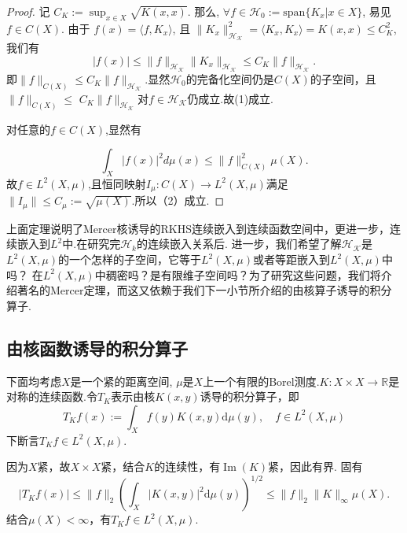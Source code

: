 \documentclass[../master.tex]{subfiles}
\begin{document}
\begin{proof}
    记 $C_K := \sup_{x \in X} \sqrt{K(x, x)}$. 那么, $\forall f \in \mathcal{H}_0 := \text{span}\{K_x | x \in X\}$, 易见 $f \in C(X)$. 由于 $f(x) = \langle f, K_x  \rangle$, 且 $\|K_x\|_{\mathcal{H_K}}^2 = \langle K_x, K_x \rangle = K(x, x) \leq C_K^2$, 我们有
$$|f(x)| \leq \|f\|_{\mathcal{H_K}} \|K_x\|_{\mathcal{H_K}} \leq C_K \|f\|_{\mathcal{H_K}}.$$
即$\|f\|_{C(X)}\leq C_K\|f\|_{\mathcal{H_K}}$.显然$\mathcal{H}_0$的完备化空间仍是$C(X)$的子空间，且$\|f\|_{C(X)}\leq$
$C_{K}\|f\|_{\mathcal{H_K}}$对$f\in\mathcal{H_K}$仍成立.故(1)成立.

对任意的$f\in C(X)$,显然有

$$\int_X|f(x)|^2d\mu(x)\leq\|f\|_{C(X)}^2\mu(X).$$
故$f\in L^2(X,\mu)$,且恒同映射$I_\mu:C(X)\to L^2(X,\mu)$满足$\|I_\mu\|\leq C_\mu:=\sqrt{\mu(X)}$.所以（2）成立.
\end{proof}

上面定理说明了Mercer核诱导的RKHS连续嵌入到连续函数空间中，更进一步，连续嵌入到$L^2$中.在研究完$\mathcal{H}_k$的连续嵌入关系后. 进一步，我们希望了解$\mathcal{H_K}$是$L^2(X,\mu)$的一个怎样的子空间，它等于$L^2(X,\mu)$或者等距嵌入到$L^2(X,\mu)$中吗？ 在$L^2(X,\mu)$中稠密吗？是有限维子空间吗？为了研究这些问题，我们将介绍著名的Mercer定理，而这又依赖于我们下一小节所介绍的由核算子诱导的积分算子.

\subsection{由核函数诱导的积分算子}
下面均考虑$X$是一个紧的距离空间, $\mu$是$X$上一个有限的Borel测度.$K:X\times X\to\mathbb{R}$是对称的连续函数.令$T_K$表示由核$K(x,y)$诱导的积分算子，即
\begin{equation*}
    T_Kf(x):=\int_X f(y)K(x,y)\mathrm{d}\mu(y),\quad f\in L^2(X,\mu)
\end{equation*}
下断言$T_Kf\in L^2(X,\mu)$.

因为$X$紧，故$X\times X$紧，结合$K$的连续性，有$\operatorname{Im}(K)$紧，因此有界. 固有
\begin{equation*}
    \left|T_Kf(x)\right|\leq \|f\|_2\left(\int_X |K(x,y)|^2\mathrm{d}\mu(y)\right)^{1/2}\leq \|f\|_2\|K\|_\infty \mu(X).
\end{equation*}
结合$\mu(X)<\infty$，有$T_Kf\in L^2(X,\mu)$.
\end{document}
